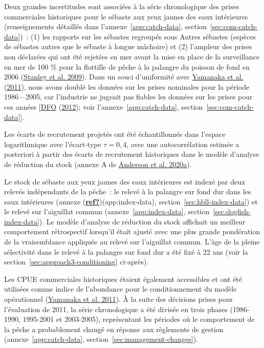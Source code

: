 \documentclass[11pt]{book}
\begin{document}
Deux grandes incertitudes sont associées à la série chronologique des prises commerciales historiques pour le sébaste aux yeux jaunes des eaux intérieures (renseignements détaillés dans l'annexe~\ref{app:catch-data}, section~\ref{sec:com-catch-data})~: (1) les rapports sur les sébastes regroupés sous Autres sébastes (espèces de sébastes autres que le sébaste à longue mâchoire) et (2) l'ampleur des prises non déclarées qui ont été rejetées en mer avant la mise en place de la surveillance en mer de 100 \% pour la flottille de pêche à la palangre du poisson de fond en 2006 (\protect\hyperlink{ref-stanley2009}{Stanley et al. 2009}). Dans un souci d'uniformité avec \protect\hyperlink{ref-yamanaka2011}{Yamanaka et al.} (\protect\hyperlink{ref-yamanaka2011}{2011}), nous avons doublé les données sur les prises nominales pour la période 1986---2005, car l'industrie ne jugeait pas fiables les données sur les prises pour ces années {[}\protect\hyperlink{ref-dfo2012}{DFO} (\protect\hyperlink{ref-dfo2012}{2012}); voir l'annexe~\ref{app:catch-data}, section~\ref{sec:com-catch-data}{]}.

Les écarts de recrutement projetés ont été échantillonnés dans l'espace logarithmique avec l'écart-type \(\tau = 0,4\), avec une autocorrélation estimée a posteriori à partir des écarts de recrutement historiques dans le modèle d'analyse de réduction du stock (annexe A de \protect\hyperlink{ref-anderson2020gfmp}{Anderson et al. 2020a}).

Le stock de sébaste aux yeux jaunes des eaux intérieures est indexé par deux relevés indépendants de la pêche~: le relevé à la palangre sur fond dur dans les eaux intérieures (annexe (\protect\hyperlink{ref-ref}{\textbf{ref?}})(app:index-data), section~\ref{sec:hbll-index-data}) et le relevé sur l'aiguillat commun (annexe~\ref{app:index-data}, section~\ref{sec:dogfish-index-data}). Le modèle d'analyse de réduction du stock affichait un meilleur comportement rétrospectif lorsqu'il était ajusté avec une plus grande pondération de la vraisemblance appliquée au relevé sur l'aiguillat commun. L'âge de la pleine sélectivité dans le relevé à la palangre sur fond dur a été fixé à 22 ans (voir la section~\ref{sec:approach3-conditioning} ci-après).

Les CPUE commerciales historiques étaient également accessibles et ont été utilisées comme indice de l'abondance pour le conditionnement du modèle opérationnel (\protect\hyperlink{ref-yamanaka2011}{Yamanaka et al. 2011}). À la suite des décisions prises pour l'évaluation de 2011, la série chronologique a été divisée en trois phases (1986-1990, 1995-2001 et 2003-2005), représentant les périodes où le comportement de la pêche a probablement changé en réponse aux règlements de gestion (annexe~\ref{app:catch-data}, section~\ref{sec:management-changes}).
\end{document}
